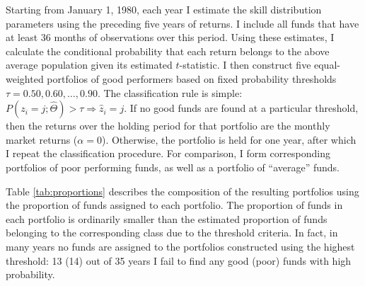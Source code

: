 Starting from January 1, 1980, each year I estimate the skill distribution parameters using the preceding five years of returns. I include all funds that have at least 36 months of observations over this period. Using these estimates, I calculate the conditional probability that each return belongs to the above average population given its estimated $t$-statistic. I then construct five equal-weighted portfolios of good performers based on fixed probability thresholds $\tau = 0.50, 0.60, \dots, 0.90$.  The classification rule is simple: $P(z_i = j; \hat{\Theta}) > \tau \Rightarrow \hat{z}_i = j$.  If no good funds are found at a particular threshold, then the returns over the holding period for that portfolio are the monthly market returns ($\alpha = 0$).  Otherwise, the portfolio is held for one year, after which I repeat the classification procedure.  For comparison, I form corresponding portfolios of poor performing funds, as well as a portfolio of ``average'' funds.

Table \ref{tab:proportions} describes the composition of the resulting portfolios using the proportion of funds assigned to each portfolio.  The proportion of funds in each portfolio is ordinarily smaller than the estimated proportion of funds belonging to the corresponding class due to the threshold criteria.  In fact, in many years no funds are assigned to the portfolios constructed using the highest threshold: 13 (14) out of 35 years I fail to find any good (poor) funds with high probability.

